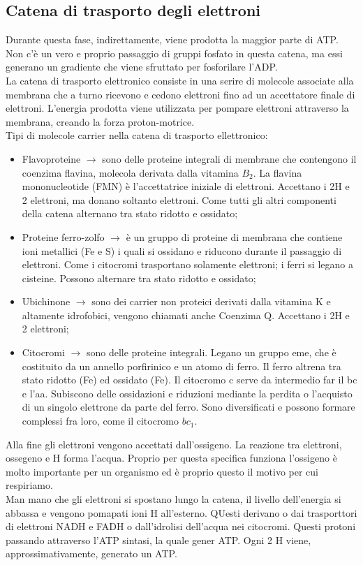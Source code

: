 \subsection{Catena di trasporto degli elettroni}
Durante questa fase, indirettamente, viene prodotta la maggior parte di ATP. Non c'\`e un vero e proprio passaggio di gruppi fosfato in questa catena, ma essi generano un gradiente che viene sfruttato per fosforilare l'ADP. 
\\La catena di trasporto elettronico consiste in una serire di molecole associate alla membrana che a turno ricevono e cedono elettroni fino ad un accettatore finale di elettroni. L'energia prodotta viene utilizzata per pompare elettroni attraverso la membrana, creando la forza proton-motrice. 
\\Tipi di molecole carrier nella catena di trasporto ellettronico:
\begin{itemize}
    \item Flavoproteine $\xrightarrow{}$ sono delle proteine integrali di membrane che contengono il coenzima flavina, molecola derivata dalla vitamina $B_2$. La flavina mononucleotide (FMN) \`e l'accettatrice iniziale di elettroni. Accettano i 2H\ap{+} e 2 elettroni, ma donano soltanto elettroni. Come tutti gli altri componenti della catena alternano tra stato ridotto e ossidato;
    \item Proteine ferro-zolfo $\xrightarrow{}$ \`e un gruppo di proteine di membrana che contiene ioni metallici (Fe e S) i quali si ossidano e riducono durante il passaggio di elettroni. Come i citocromi trasportano solamente elettroni; i ferri si legano a cisteine. Possono alternare tra stato ridotto e ossidato;
    \item Ubichinone $\xrightarrow{}$ sono dei carrier non proteici derivati dalla vitamina K e altamente idrofobici, vengono chiamati anche Coenzima Q. Accettano i 2H\ap{+} e 2 elettroni;
    \item Citocromi $\xrightarrow{}$ sono delle proteine integrali. Legano un gruppo eme, che \`e costituito da un annello porfirinico e un atomo di ferro. Il ferro altrena tra stato ridotto (Fe) ed ossidato (Fe). Il citocromo c serve da intermedio far il bc e l'aa. Subiscono delle ossidazioni e riduzioni mediante la perdita o l'acquisto di un singolo elettrone da parte del ferro. Sono diversificati e possono formare complessi fra loro, come il citocromo $bc_1$.
\end{itemize}
Alla fine gli elettroni vengono accettati dall'ossigeno. La reazione tra elettroni, ossegeno e H\ap{+} forma l'acqua. Proprio per questa specifica funziona l'ossigeno \`e molto importante per un organismo ed \`e proprio questo il motivo per cui respiriamo.
\\Man mano che gli elettroni si spostano lungo la catena, il livello dell'energia si abbassa e vengono pomapati ioni H\ap{+} all'esterno. QUesti derivano o dai trasporttori di elettroni NADH e FADH o dall'idrolisi dell'acqua nei citocromi. Questi protoni passando attraverso l'ATP sintasi, la quale gener ATP. Ogni 2 H\ap{+} viene, approssimativamente, generato un ATP.
